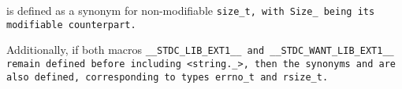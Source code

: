  is defined as a synonym for non-modifiable \tt{size_t},
with \tt{Size_} being its modifiable counterpart.

Additionally, if both macros \tt{__STDC_LIB_EXT1__} and
\tt{__STDC_WANT_LIB_EXT1__} remain defined before including \tt{<string._>},
then the synonyms  and  are also defined,
corresponding to types \tt{errno_t} and \tt{rsize_t}.

